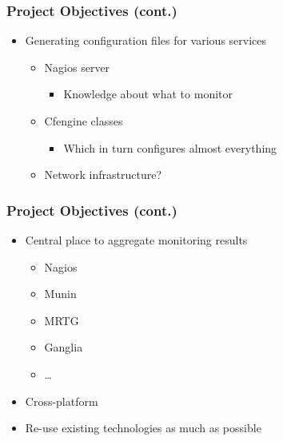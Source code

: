 \documentclass{beamer}
\begin{document}
\begin{frame}
\frametitle{Project Objectives (cont.)}

\begin{itemize}
    \item Generating configuration files for various services
        \begin{itemize}
            \item Nagios server
                \begin{itemize}
                    \item Knowledge about what to monitor
                \end{itemize}
            \item Cfengine classes
                \begin{itemize}
                    \item Which in turn configures almost everything
                \end{itemize}
            \item Network infrastructure?
        \end{itemize}
\end{itemize}
\end{frame}

\begin{frame}
\frametitle{Project Objectives (cont.)}
    \begin{itemize}
    \item Central place to aggregate monitoring results
        \begin{itemize}
            \item Nagios
            \item Munin
            \item MRTG
            \item Ganglia
            \item \ldots
        \end{itemize}
    \item Cross-platform
    \item Re-use existing technologies as much as possible
\end{itemize}

\end{frame}
\end{document}
